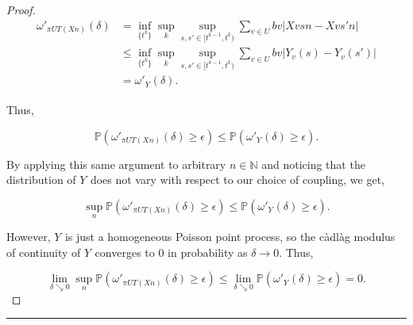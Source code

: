 \documentclass[12pt]{article}
\newcommand{\mb}{\mathbb}
\newcommand{\ra}{\rightarrow}
\newcommand{\ep}{\epsilon}
\newcommand{\lin}{\rule{\linewidth}{0.4 pt}}
\newcommand{\pr}{\mb{P}}							%
\renewcommand{\v}{v}							%
\renewcommand{\U}{U}							%
\renewcommand{\b}{b}							%
\newcommand{\T}{T}								%
\renewcommand{\t}{t}							%
\newcommand{\proj}{\pi}							%
\renewcommand{\tt}{s}							%
\newcommand{\ttt}{s'}							%
\newcommand{\X}{X}								%
\newcommand{\sln}[1]{^{#1}}						%
\renewcommand{\it}{k}								%
\newcommand{\rxvtt}[2]{Y_{#1}{(#2)}}				%
\newcommand{\rxvtts}[2]{Y_{#1}{#2}}					%
\begin{document}
\begin{proof}
\begin{align*}
\omega'_{\proj{\U}{\T}\left(\X{}{}{n}\right)}(\delta) &= \inf_{\{\t\sln{\it}\}}\sup_\it\sup_{\tt,\ttt \in [\t\sln{\it-1},\t\sln{\it})} \sum_{\v\in \U} \b{\v}|\X{\v}{\tt}{n} - \X{\v}{\ttt}{n}|\\
&\leq \inf_{\{\t\sln{\it}\}}\sup_\it\sup_{\tt,\ttt \in [\t\sln{\it-1},\t\sln{\it})} \sum_{\v\in \U} \b{\v}|\rxvtt{\v}{\tt} - \rxvtt{\v}{\ttt}|\\
&= \omega'_{\rxvtts{}{}}(\delta).
\end{align*}

Thus,

\[\pr\left(\omega'_{\proj{\U}{\T}\left(\X{}{}{n}\right)}(\delta) \geq \ep\right) \leq \pr\left(\omega'_{\rxvtts{}{}}(\delta) \geq \ep\right).\]

By applying this same argument to arbitrary \(n\in \mb{N}\) and noticing that the distribution of \(\rxvtts{}{}\) does not vary with respect to our choice of coupling, we get,

\[\sup_{n}\pr\left(\omega'_{\proj{\U}{\T}\left(\X{}{}{n}\right)}(\delta)\geq \ep\right) \leq \pr\left(\omega'_{\rxvtts{}{}}(\delta) \geq \ep\right).\]

However, \(\rxvtts{}{}\) is just a homogeneous Poisson point process, so the c\`adl\`ag modulus of continuity of \(\rxvtts{}{}\) converges to 0 in probability as \(\delta \ra 0\). Thus,

\[\lim_{\delta \searrow 0}\sup_{n}\pr\left(\omega'_{\proj{\U}{\T}\left(\X{}{}{n}\right)}(\delta) \geq \ep\right) \leq \lim_{\delta\searrow 0}\pr\left(\omega'_{\rxvtts{}{}}(\delta)\geq \ep\right) = 0.\]


\end{proof}

\lin
\end{document}
